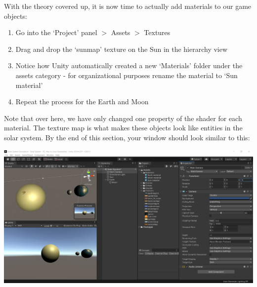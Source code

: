 \documentclass{article}[a4paper,12pt]
\theoremstyle{definition}
\begin{document}
With the theory covered up, it is now time to actually add materials to our game objects:
\begin{enumerate}
	\item Go into the `Project' panel $>$ Assets $>$ Textures
	\item Drag and drop the `sunmap' texture on the Sun in the hierarchy view
	\item Notice how Unity automatically created a new `Materials' folder under the assets category - for organizational purposes rename the material to `Sun material'
	\item Repeat the process for the Earth and Moon
\end{enumerate}
Note that over here, we have only changed one property of the shader for each material. The texture map is what makes these objects look like entities in the solar system. By the end of this section, your window should look similar to this:
\begin{center}\includegraphics[width=\textwidth]{addng_materials.png}\end{center}
\end{document}
